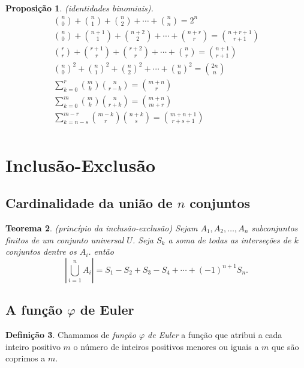 \documentclass{article}
\theoremstyle{plain}
\newtheorem{thm}{Teorema}[section]
\newtheorem{prop}[thm]{Proposição}
\theoremstyle{definition}
\newtheorem{defn}[thm]{Definição}
\theoremstyle{remark}
\begin{document}
\begin{prop} (identidades binomiais).
    \begin{gather}
        \binom{n}{0}+\binom{n}{1}+\binom{n}{2}+\cdots+\binom{n}{n} = 2^n \\
        \binom{n}{0}+\binom{n+1}{1}+\binom{n+2}{2}+\cdots+\binom{n+r}{r} = \binom{n+r+1}{r+1} \\
        \binom{r}{r}+\binom{r+1}{r}+\binom{r+2}{r}+\cdots+\binom{n}{r} = \binom{n+1}{r+1} \\
        \binom{n}{0}^2 + \binom{n}{1}^2 + \binom{n}{2}^2 + \cdots + \binom{n}{n}^2 = \binom{2n}{n} \\
        \sum_{k=0}^{r} \binom{m}{k}\binom{n}{r-k} = \binom{m+n}{r} \\
        \sum_{k=0}^{m} \binom{m}{k}\binom{n}{r+k} = \binom{m+n}{m+r} \\
        \sum_{k=n-s}^{m-r} \binom{m-k}{r}\binom{n+k}{s} = \binom{m+n+1}{r+s+1} \\
    \end{gather}
\end{prop}

\section{Inclusão-Exclusão}

\subsection{Cardinalidade da união de \(n\) conjuntos}

\begin{thm} (princípio da inclusão-exclusão)
    Sejam \(A_1, A_2, \ldots, A_n\) subconjuntos finitos de um conjunto universal \(U\). Seja \(S_k\) a soma de todas as interseções de \(k\) conjuntos dentre os \(A_i\). então
    \begin{equation}
        \left| \bigcup_{i=1}^{n} A_i \right| = S_1 - S_2 + S_3 - S_4 + \cdots + (-1)^{n+1} S_n.
    \end{equation}
\end{thm}

\subsection{A função \(\varphi\) de Euler}

\begin{defn}
    Chamamos de \emph{função \(\varphi\) de Euler} a função que atribui a cada inteiro positivo \(m\) o número de inteiros positivos menores ou iguais a \(m\) que são coprimos a \(m\).
\end{defn}
\end{document}
